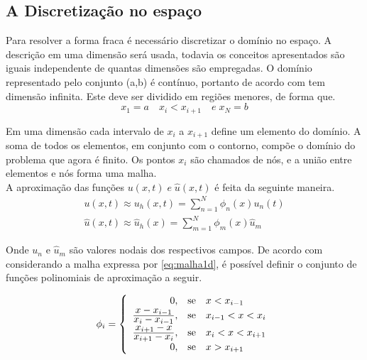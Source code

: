 \subsection{A Discretização no espaço}

Para resolver a forma fraca é necessário discretizar o domínio no espaço. A descrição em uma dimensão será usada, todavia os conceitos apresentados são iguais independente de quantas dimensões são empregadas. O domínio representado pelo conjunto (a,b) é contínuo, portanto de acordo com \cite{Paulo} tem dimensão infinita. Este deve ser dividido em regiões menores, de forma que.
\begin{equation} \label{eq:malha1d}
	x_1 = a \quad x_i<x_{i+1} \quad e \; x_N = b
\end{equation}

Em uma dimensão cada intervalo de $ x_i $  a $ x_{i+1} $ define um elemento do domínio. A soma de todos os elementos, em conjunto com o contorno, compõe o domínio do problema que agora é finito. Os pontos $ x_i $ são chamados de nós, e a união entre elementos e nós forma uma malha. \\

A aproximação das funções $ u(x,t) \; e \; \hat{u}(x,t) $ é feita da seguinte maneira.
\begin{align} 
	u(x,t) \approx u_h(x,t) = \sum_{n=1}^{N} \phi_n (x) u_n(t) \\
	\hat{u}(x,t) \approx \hat{u}_h(x) = \sum_{m=1}^{N} \phi_m (x) \hat{u}_m  
\end{align}

Onde $ u_n $ e $ \hat{u}_m $ são valores nodais dos respectivos campos.
De acordo com \cite{zienkiewicz2013} considerando a malha expressa por \ref{eq:malha1d}, é possível definir o conjunto de funções polinomiais de aproximação a seguir.

\begin{equation} \label{eq:funcform}
    \phi_i =  \left \{ \begin{array}{rcl}
         0, & \text{se} & x < x_{i-1} \\
        \frac{\displaystyle x - x_{i-1}}{\displaystyle x_i - x_{i-1}}, &  \text{se} & x_{i-1} < x < x_{i} \\
        \frac{\displaystyle x_{i+1} - x}{\displaystyle x_{i+1} - x_{i}}, &  \text{se} & x_i < x < x_{i+1} \\
         0, & \text{se} & x > x_{i+1}
    \end{array} \right.
\end{equation}

